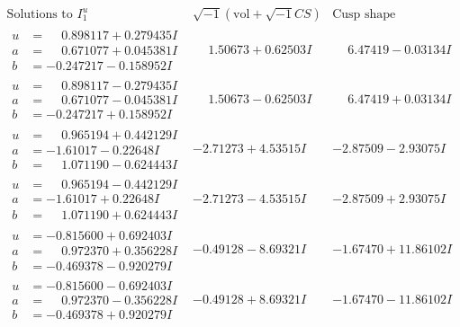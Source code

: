 \documentclass[1p]{elsarticle_modified}
\theoremstyle{definition}
\newcommand{\I}{\sqrt{-1}}
\begin{document}
$$\begin{array}{c|c|c}  
\text{Solutions to }I^u_{1}& \I (\text{vol} + \sqrt{-1}CS) & \text{Cusp shape}\\
 \hline 
\begin{aligned}
u &= \phantom{-}0.898117 + 0.279435 I \\
a &= \phantom{-}0.671077 + 0.045381 I \\
b &= -0.247217 - 0.158952 I\end{aligned}
 & \phantom{-}1.50673 + 0.62503 I & \phantom{-}6.47419 - 0.03134 I \\ \hline\begin{aligned}
u &= \phantom{-}0.898117 - 0.279435 I \\
a &= \phantom{-}0.671077 - 0.045381 I \\
b &= -0.247217 + 0.158952 I\end{aligned}
 & \phantom{-}1.50673 - 0.62503 I & \phantom{-}6.47419 + 0.03134 I \\ \hline\begin{aligned}
u &= \phantom{-}0.965194 + 0.442129 I \\
a &= -1.61017 - 0.22648 I \\
b &= \phantom{-}1.071190 - 0.624443 I\end{aligned}
 & -2.71273 + 4.53515 I & -2.87509 - 2.93075 I \\ \hline\begin{aligned}
u &= \phantom{-}0.965194 - 0.442129 I \\
a &= -1.61017 + 0.22648 I \\
b &= \phantom{-}1.071190 + 0.624443 I\end{aligned}
 & -2.71273 - 4.53515 I & -2.87509 + 2.93075 I \\ \hline\begin{aligned}
u &= -0.815600 + 0.692403 I \\
a &= \phantom{-}0.972370 + 0.356228 I \\
b &= -0.469378 - 0.920279 I\end{aligned}
 & -0.49128 - 8.69321 I & -1.67470 + 11.86102 I \\ \hline\begin{aligned}
u &= -0.815600 - 0.692403 I \\
a &= \phantom{-}0.972370 - 0.356228 I \\
b &= -0.469378 + 0.920279 I\end{aligned}
 & -0.49128 + 8.69321 I & -1.67470 - 11.86102 I \\ \hline\begin{aligned}

\end{aligned}
\end{array}$$
\end{document}
